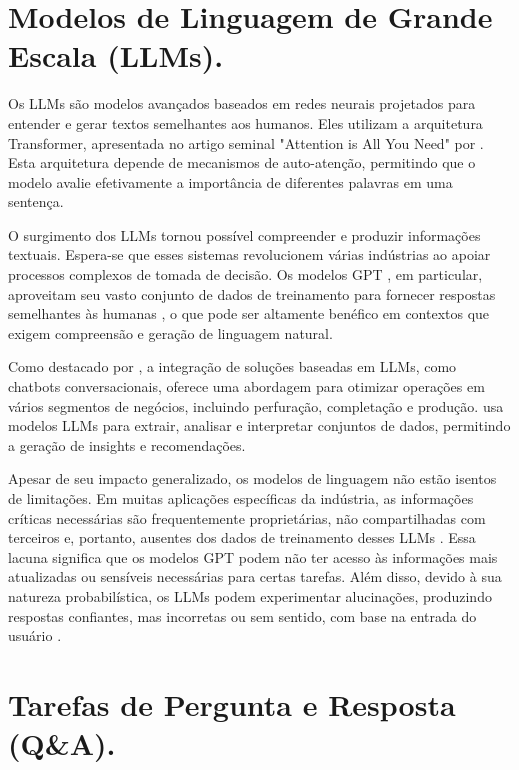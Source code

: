         \section{Modelos de Linguagem de Grande Escala (LLMs).}  
        
            Os LLMs são modelos avançados baseados em redes neurais projetados para entender e gerar textos semelhantes aos humanos. Eles utilizam a arquitetura Transformer, apresentada no artigo seminal "Attention is All You Need" por \cite{Vaswani2017}. Esta arquitetura depende de mecanismos de auto-atenção, permitindo que o modelo avalie efetivamente a importância de diferentes palavras em uma sentença.
            
            O surgimento dos LLMs tornou possível compreender e produzir informações textuais. Espera-se que esses sistemas revolucionem várias indústrias ao apoiar processos complexos de tomada de decisão. Os modelos GPT \cite{OpenAI2023}, em particular, aproveitam seu vasto conjunto de dados de treinamento para fornecer respostas semelhantes às humanas \cite{Mosser2024}, o que pode ser altamente benéfico em contextos que exigem compreensão e geração de linguagem natural.
            
            Como destacado por \cite{Singh2023}, a integração de soluções baseadas em LLMs, como chatbots conversacionais, oferece uma abordagem para otimizar operações em vários segmentos de negócios, incluindo perfuração, completação e produção. \cite{Singh2023} usa modelos LLMs para extrair, analisar e interpretar conjuntos de dados, permitindo a geração de insights e recomendações.
            
            Apesar de seu impacto generalizado, os modelos de linguagem não estão isentos de limitações. Em muitas aplicações específicas da indústria, as informações críticas necessárias são frequentemente proprietárias, não compartilhadas com terceiros e, portanto, ausentes dos dados de treinamento desses LLMs \cite{Mosser2024}. Essa lacuna significa que os modelos GPT podem não ter acesso às informações mais atualizadas ou sensíveis necessárias para certas tarefas. Além disso, devido à sua natureza probabilística, os LLMs podem experimentar alucinações, produzindo respostas confiantes, mas incorretas ou sem sentido, com base na entrada do usuário \cite{OpenAI2023}.
    
    
        \section{Tarefas de Pergunta e Resposta (Q\&A).}
        
